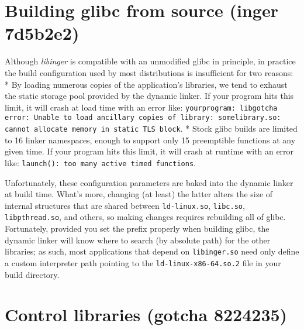 \documentclass[12pt,letterpaper]{book}
\begin{document}
\section{Building glibc from source (inger 7d5b2e2)}

Although \textit{libinger} is compatible with an unmodified glibc in principle, in practice the build
configuration used by most distributions is insufficient for two reasons:
 * By loading numerous copies of the application's libraries, we tend to exhaust the static storage
   pool provided by the dynamic linker.  If your program hits this limit, it will crash at load time
   with an error like: \texttt{yourprogram: libgotcha error: Unable to load ancillary copies of library:
   somelibrary.so: cannot allocate memory in static TLS block}.
 * Stock glibc builds are limited to 16 linker namespaces, enough to support only 15 preemptible
   functions at any given time.  If your program hits this limit, it will crash at runtime with an
   error like: \texttt{launch(): too many active timed functions}.

Unfortunately, these configuration parameters are baked into the dynamic linker at build time.
What's more, changing (at least) the latter alters the size of internal structures that are shared
between \texttt{ld-linux.so}, \texttt{libc.so}, \texttt{libpthread.so}, and others, so making changes requires rebuilding
all of glibc.  Fortunately, provided you set the prefix properly when building glibc, the dynamic
linker will know where to search (by absolute path) for the other libraries; as such, most
applications that depend on \texttt{libinger.so} need only define a custom interpreter path pointing to the
\texttt{ld-linux-x86-64.so.2} file in your build directory.


\section{Control libraries (gotcha 8224235)}
\end{document}
